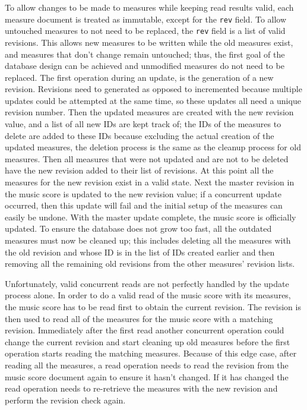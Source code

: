\documentclass[letterpaper,12pt]{article}
\begin{document}
To allow changes to be made to measures while keeping read results valid, each measure document is treated as immutable,
except for the \lstinline{rev} field. To allow untouched measures to not need to be replaced, the \lstinline{rev} field
is a list of valid revisions. This allows new measures to be written while the old measures exist, and measures
that don't change remain untouched; thus, the first goal of the database design can be achieved and unmodified measures
do not need to be replaced. The first operation during an update, is the generation of a new revision. Revisions need to
generated as opposed to incremented because multiple updates could be attempted at the same time, so these updates all
need a unique revision number. Then the updated measures are created with the new revision value, and a list of all new
IDs are kept track of; the IDs of the measures to delete are added to these IDs because excluding the actual creation of
the updated measures, the deletion process is the same as the cleanup process for old measures. Then all measures that
were not updated and are not to be deleted have the new revision added to their list of revisions. At this point all the
measures for the new revision exist in a valid state. Next the master revision in the music score is updated to the new
revision value; if a concurrent update occurred, then this update will fail and the initial setup of the measures can
easily be undone. With the master update complete, the music score is officially updated. To ensure the database does
not grow too fast, all the outdated measures must now be cleaned up; this includes deleting all the measures with the
old revision and whose ID is in the list of IDs created earlier and then removing all the remaining old revisions from
the other measures' revision lists.

Unfortunately, valid concurrent reads are not perfectly handled by the update process alone. In order to do a valid read
of the music score with its measures, the music score has to be read first to obtain the current revision. The revision
is then used to read all of the measures for the music score with a matching revision. Immediately after the first read
another concurrent operation could change the current revision and start cleaning up old measures before the first
operation starts reading the matching measures. Because of this edge case, after reading all the measures, a read
operation needs to read the revision from the music score document again to ensure it hasn't changed. If it has changed
the read operation needs to re-retrieve the measures with the new revision and perform the revision check again.
\end{document}
